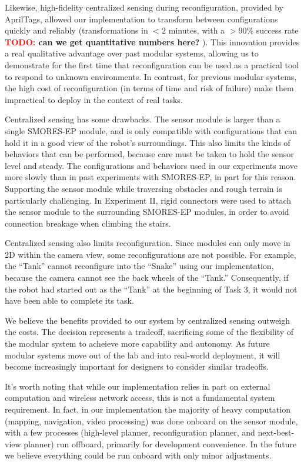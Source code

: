 \documentclass[conference]{IEEEtran}
\newcommand{\TODO}[1]{ {\bf \textcolor{red}{TODO:} #1 }}
\begin{document}
Likewise, high-fidelity centralized sensing during reconfiguration, provided by AprilTags, allowed our implementation to transform between configurations quickly and reliably (transformations in $<2$ minutes, with a $>90\%$ success rate \TODO{can we get quantitative numbers here?}).  This innovation provides a real qualitative advantage over past modular systems, allowing us to demonstrate for the first time that reconfiguration can be used as a practical tool to respond to unknown environments. In contrast, for previous modular systems, the high cost of reconfiguration (in terms of time and risk of failure) make them impractical to deploy in the context of real tasks.

Centralized sensing has some drawbacks.  The sensor module is larger than a single SMORES-EP module, and is only compatible with configurations that can hold it in a good view of the robot's surroundings.  This also limits the kinds of behaviors that can be performed, because care must be taken to hold the sensor level and steady.  The configurations and behaviors used in our experiments move more slowly than in past experiments with SMORES-EP, in part for this reason. Supporting the sensor module while traversing obstacles and rough terrain is particularly challenging.  In Experiment II, rigid connectors were used to attach the sensor module to the surrounding SMORES-EP modules, in order to avoid connection breakage when climbing the stairs.

Centralized sensing also limits reconfiguration. Since modules can only move in 2D within the camera view,  some reconfigurations are not possible.  For example,  the ``Tank'' cannot reconfigure into the ``Snake'' using  our implementation, because the camera cannot see the back wheels of the ``Tank.''  Consequently, if the robot had started out as the ``Tank'' at the beginning of Task 3, it would not have been able to complete its task.

We believe the benefits provided to our system by centralized sensing outweigh the costs.  The decision represents a tradeoff, sacrificing some of the flexibility of the modular system to acheieve more capability and autonomy.  As future modular systems move out of the lab and into real-world deployment, it will become increasingly important for designers to consider similar tradeoffs.

It's worth noting that while our implementation relies in part on external computation and wireless network access, this is not a fundamental system requirement.   In fact,  in our implementation the majority of  heavy computation (mapping, navigation, video processing) was done onboard on the sensor module, with a few processes (high-level planner, reconfiguration planner, and next-best-view planner) run offboard, primarily for development convenience. %
In the future we believe everything could be run onboard with only minor adjustments.
%
\end{document}
